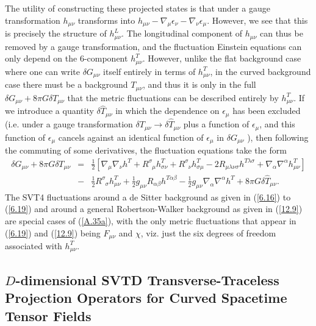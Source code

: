 \documentclass[aps,onecolumn,10pt]{revtex4}
\numberwithin{equation}{section}
\numberwithin{equation}{section}
\begin{document}
The utility of constructing these projected states is that under a gauge transformation $h_{\mu\nu}$ transforms into $h_{\mu\nu}-\nabla_{\mu}\epsilon_{\nu}-\nabla_{\nu}\epsilon_{\mu}$. However, we see that this is precisely the structure of $h^{L}_{\mu\nu}$. The longitudinal component of $h_{\mu\nu}$ can thus be removed by a gauge transformation, and the fluctuation Einstein equations can only depend on the 6-component $h^{T}_{\mu\nu}$. However, unlike the flat background case where one can write $\delta G_{\mu\nu}$ itself entirely in terms of $h^T_{\mu\nu}$, in the curved background case there must be a background $T_{\mu\nu}$, and thus it is only in the full $\delta G_{\mu\nu}+8\pi G \delta T_{\mu\nu}$ that the metric fluctuations can be described entirely by $h^T_{\mu\nu}$. If we introduce a quantity $\delta\hat{T}_{\mu\nu}$ in which the dependence on $\epsilon_{\mu}$ has been excluded (i.e. under a gauge transformation $\delta T_{\mu\nu}\rightarrow \delta \hat{T}_{\mu\nu}$ plus a function of $\epsilon_{\mu}$, and this function of $\epsilon_{\mu}$ cancels against an identical function of $\epsilon_{\mu}$ in $\delta G_{\mu\nu}$ \cite{footnote13}), then following the commuting of some derivatives,  the fluctuation equations take the form \cite{Mannheim2005}
%
\begin{eqnarray} 
\delta G_{\mu\nu}+8\pi G \delta T_{\mu\nu}
&=&\frac{1}{2}[\nabla_{\mu}\nabla_{\nu}h^{T}
+R^{\sigma}_{\phantom{\sigma}\mu}h_{\sigma\nu}^{T}
+R^{\sigma}_{\phantom{\sigma}\nu}h_{\sigma\mu}^{T}
-2R_{\mu\lambda\nu\sigma}h^{T\lambda\sigma}
+\nabla_{\alpha}\nabla^{\alpha}h_{\mu\nu}^{T}]
\nonumber \\
&-&\frac{1}{2}R^{\sigma}_{\phantom{\sigma}\sigma}h^{T}_{\mu\nu}
+\frac{1}{ 2}g_{\mu\nu}R_{\alpha\beta}h^{T\alpha\beta}
-\frac{1}{2}g_{\mu\nu}\nabla_{\alpha}\nabla^{\alpha}h^{T}
+8\pi G \delta\hat{T}_{\mu\nu}.
\label{A.35a}
\end{eqnarray}
% 
The SVT4 fluctuations around a de Sitter background as given in (\ref{6.16}) to (\ref{6.19}) and around a general Robertson-Walker background as given in (\ref{12.9}) are special cases of (\ref{A.35a}), with the only metric fluctuations that appear in (\ref{6.19}) and (\ref{12.9}) being $F_{\mu\nu}$ and $\chi$, viz. just the six degrees of freedom associated with $h^T_{\mu\nu}$.

\subsection{$D$-dimensional SVTD Transverse-Traceless Projection Operators for Curved Spacetime Tensor Fields}
\end{document}
